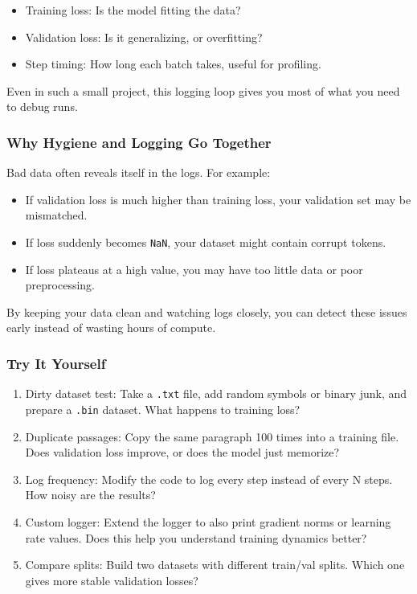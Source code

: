 \documentclass[
  letterpaper,
  DIV=11,
  numbers=noendperiod]{scrreprt}
\providecommand{\tightlist}{%
  \setlength{\itemsep}{0pt}\setlength{\parskip}{0pt}}
\begin{document}
\begin{itemize}
\tightlist
\item
  Training loss: Is the model fitting the data?
\item
  Validation loss: Is it generalizing, or overfitting?
\item
  Step timing: How long each batch takes, useful for profiling.
\end{itemize}

Even in such a small project, this logging loop gives you most of what
you need to debug runs.

\subsubsection{Why Hygiene and Logging Go
Together}\label{why-hygiene-and-logging-go-together}

Bad data often reveals itself in the logs. For example:

\begin{itemize}
\tightlist
\item
  If validation loss is much higher than training loss, your validation
  set may be mismatched.
\item
  If loss suddenly becomes \texttt{NaN}, your dataset might contain
  corrupt tokens.
\item
  If loss plateaus at a high value, you may have too little data or poor
  preprocessing.
\end{itemize}

By keeping your data clean and watching logs closely, you can detect
these issues early instead of wasting hours of compute.

\subsubsection{Try It Yourself}\label{try-it-yourself-9}

\begin{enumerate}
\def\labelenumi{\arabic{enumi}.}
\tightlist
\item
  Dirty dataset test: Take a \texttt{.txt} file, add random symbols or
  binary junk, and prepare a \texttt{.bin} dataset. What happens to
  training loss?
\item
  Duplicate passages: Copy the same paragraph 100 times into a training
  file. Does validation loss improve, or does the model just memorize?
\item
  Log frequency: Modify the code to log every step instead of every N
  steps. How noisy are the results?
\item
  Custom logger: Extend the logger to also print gradient norms or
  learning rate values. Does this help you understand training dynamics
  better?
\item
  Compare splits: Build two datasets with different train/val splits.
  Which one gives more stable validation losses?
\end{enumerate}
\end{document}

